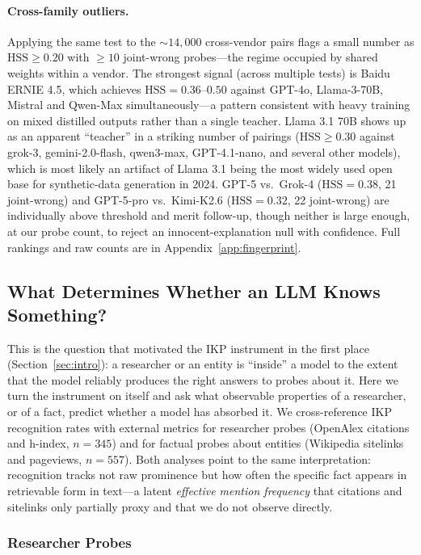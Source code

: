 \documentclass[11pt]{article}
\begin{document}
\paragraph{Cross-family outliers.} Applying the same test to the ${\sim}14{,}000$ cross-vendor pairs flags a small number as $\mathrm{HSS} \geq 0.20$ with $\geq 10$ joint-wrong probes---the regime occupied by shared weights within a vendor. The strongest signal (across multiple tests) is Baidu ERNIE 4.5, which achieves $\mathrm{HSS} = 0.36$--$0.50$ against GPT-4o, Llama-3-70B, Mistral and Qwen-Max simultaneously---a pattern consistent with heavy training on mixed distilled outputs rather than a single teacher. Llama 3.1 70B shows up as an apparent ``teacher'' in a striking number of pairings ($\mathrm{HSS} \geq 0.30$ against grok-3, gemini-2.0-flash, qwen3-max, GPT-4.1-nano, and several other models), which is most likely an artifact of Llama 3.1 being the most widely used open base for synthetic-data generation in 2024. GPT-5 vs.\ Grok-4 ($\mathrm{HSS} = 0.38$, 21 joint-wrong) and GPT-5-pro vs.\ Kimi-K2.6 ($\mathrm{HSS} = 0.32$, 22 joint-wrong) are individually above threshold and merit follow-up, though neither is large enough, at our probe count, to reject an innocent-explanation null with confidence. Full rankings and raw counts are in Appendix~\ref{app:fingerprint}.

\subsection{What Determines Whether an LLM Knows Something?}
\label{sec:recognition}

This is the question that motivated the IKP instrument in the first place (Section~\ref{sec:intro}): a researcher or an entity is ``inside'' a model to the extent that the model reliably produces the right answers to probes about it. Here we turn the instrument on itself and ask what observable properties of a researcher, or of a fact, predict whether a model has absorbed it. We cross-reference IKP recognition rates with external metrics for researcher probes (OpenAlex citations and h-index, $n = 345$) and for factual probes about entities (Wikipedia sitelinks and pageviews, $n = 557$). Both analyses point to the same interpretation: recognition tracks not raw prominence but how often the specific fact appears in retrievable form in text---a latent \emph{effective mention frequency} that citations and sitelinks only partially proxy and that we do not observe directly.

\subsubsection{Researcher Probes}
\label{sec:recognition-researchers}
\end{document}
